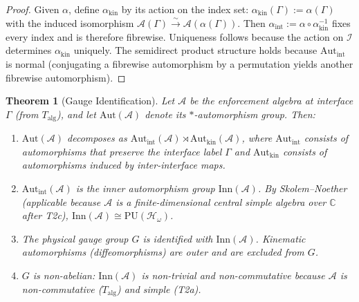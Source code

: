 \documentclass[11pt,a4paper]{article}
\newtheorem{theorem}{Theorem}[section]
\theoremstyle{definition}
\begin{document}
\begin{proof}
Given $\alpha$, define $\alpha_{\mathrm{kin}}$ by its action on the
index set: $\alpha_{\mathrm{kin}}(\Gamma) := \alpha(\Gamma)$ with the
induced isomorphism
$\mathcal{A}(\Gamma) \xrightarrow{\sim} \mathcal{A}(\alpha(\Gamma))$.
Then $\alpha_{\mathrm{int}} := \alpha \circ \alpha_{\mathrm{kin}}^{-1}$
fixes every index and is therefore fibrewise.  Uniqueness follows because
the action on $\mathcal{I}$ determines $\alpha_{\mathrm{kin}}$
uniquely.  The semidirect product structure holds because
$\mathrm{Aut}_{\mathrm{int}}$ is normal (conjugating a fibrewise
automorphism by a permutation yields another fibrewise automorphism).
\end{proof}

\begin{theorem}[Gauge Identification]\label{thm:gauge_ident}
Let $\mathcal{A}$ be the enforcement algebra at interface $\Gamma$
(from $T_{\mathrm{alg}}$), and let $\mathrm{Aut}(\mathcal{A})$ denote
its $*$-automorphism group.  Then:
\begin{enumerate}[label=(\roman*),nosep]
  \item $\mathrm{Aut}(\mathcal{A})$ decomposes as
        $\mathrm{Aut}_{\mathrm{int}}(\mathcal{A}) \rtimes
        \mathrm{Aut}_{\mathrm{kin}}(\mathcal{A})$,
        where $\mathrm{Aut}_{\mathrm{int}}$ consists of automorphisms
        that preserve the interface label $\Gamma$ and
        $\mathrm{Aut}_{\mathrm{kin}}$ consists of automorphisms
        induced by inter-interface maps.
  \item $\mathrm{Aut}_{\mathrm{int}}(\mathcal{A})$ is the inner
        automorphism group $\mathrm{Inn}(\mathcal{A})$.  By
        Skolem--Noether (applicable because $\mathcal{A}$ is a
        finite-dimensional central simple algebra over $\mathbb{C}$
        after T2c), $\mathrm{Inn}(\mathcal{A}) \cong
        \mathrm{PU}(\mathcal{H}_\omega)$.
  \item The physical gauge group $G$ is identified with
        $\mathrm{Inn}(\mathcal{A})$.  Kinematic automorphisms
        (diffeomorphisms) are outer and are excluded from $G$.
  \item $G$ is non-abelian: $\mathrm{Inn}(\mathcal{A})$ is non-trivial
        and non-commutative because $\mathcal{A}$ is non-commutative
        ($T_{\mathrm{alg}}$) and simple (T2a).
\end{enumerate}
\end{theorem}
\end{document}
